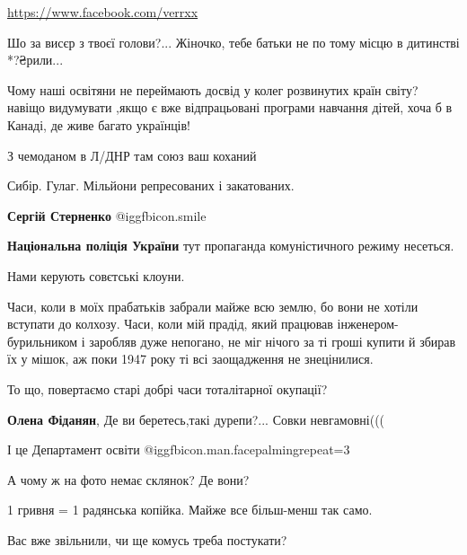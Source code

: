\begin{itemize}
\url{https://www.facebook.com/verrxx}\par
Шо за висєр з твоєї голови?... Жіночко, тебе батьки не по тому місцю в
дитинстві *?₴рили...


Чому наші освітяни не переймають досвід у колег розвинутих країн світу? навіщо
видумувати ,якщо є вже відпрацьовані програми навчання дітей, хоча б в Канаді, де
живе багато українців!


З чемоданом в Л/ДНР там союз ваш коханий

Сибір. Гулаг. Мільйони репресованих і закатованих.

\textbf{Сергій Стерненко}  @igg{fbicon.smile} 

\textbf{Національна поліція України} тут пропаганда комуністичного режиму несеться.

Нами керують совєтські клоуни.

Часи, коли в моїх прабатьків забрали майже всю землю, бо вони не хотіли вступати до колхозу.
Часи, коли мій прадід, який працював інженером-бурильником і заробляв дуже непогано, не міг нічого за ті гроші купити й збирав їх у мішок, аж поки 1947 року ті всі заощадження не знецінилися.

То що, повертаємо старі добрі часи тоталітарної окупації?


\textbf{Олена Фіданян},
Де ви беретесь,такі дурепи?...
Совки невгамовні(((


І це Департамент освіти  @igg{fbicon.man.facepalming}{repeat=3} 

А чому ж на фото немає склянок? Де вони?


1 гривня = 1 радянська копійка. Майже все більш-менш так само.

Вас вже звільнили, чи ще комусь треба постукати?

\end{itemize} %
